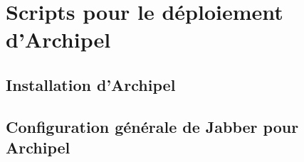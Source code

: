 \section{Scripts pour le déploiement d'Archipel}
\subsection{Installation d'Archipel}

\subsection{Configuration générale de Jabber pour Archipel}

